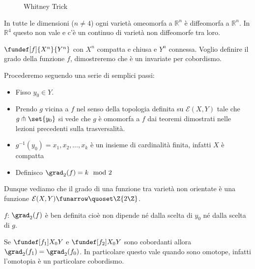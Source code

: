 \begin{figure}
    \centering %
    
    \caption{Whitney Trick}
\end{figure}

\begin{oss} %
 In tutte le dimensioni ($n \neq 4$) ogni varietà omeomorfa a $\mathbb{R}^{n}$ è diffeomorfa a  $\mathbb{R}^{n}$. In $\mathbb{R}^{4}$ questo non vale e c'è un continuo di varietà 
 non diffeomorfe tra loro.
\end{oss}

$\fundef[f]{X^{n}}{Y^{n}}$ con $X^{n}$ compatta e chiusa e $Y^{n}$ connessa. Voglio definire il grado della funzione $f$, dimostreremo che è un invariate per cobordismo.

\begin{defn}
Procederemo seguendo una serie di semplici passi:
\begin{itemize}
 \item Fisso $y_{0} \in Y$.
 \item Prendo $g$ vicina a $f$ nel senso della topologia definita su $\mathcal{E}(X, Y)$ tale che $g \pitchfork \set{y_{0}}$ si vede che $g$ è 
 omomorfa a $f$ dai teoremi dimostrati nelle lezioni precedenti sulla trasversalità.
 \item $g^{-1}(y_{0}) = {x_{1}, x_{2}, \dots, x_{k}}$ è un insieme di cardinalità finita, infatti $X$ è compatta
 \item Definisco $\grad_{2}(f) = k \mod 2$
\end{itemize}
\end{defn}

Dunque vediamo che il grado di una funzione tra varietà non orientate è una funzione $ \mathcal{E}(X, Y) \funarrow \quoset\Z{2\Z}$.

\begin{teo}
$f$: $\grad_{2}(f)$ è ben definita cioè non dipende né dalla scelta di $y_{0}$ né dalla scelta di $g$. 
\end{teo}

\begin{teo}
 Se $\fundef[f_{1}]{X_{0}}{Y}$ e $\fundef[f_{2}]{X_{0}}{Y}$ sono cobordanti allora $\grad_{2}(f_{1}) = \grad_{2}(f_{0})$. In particolare questo vale quando sono omotope,
 infatti l'omotopia è un particolare cobordismo.
\end{teo}

